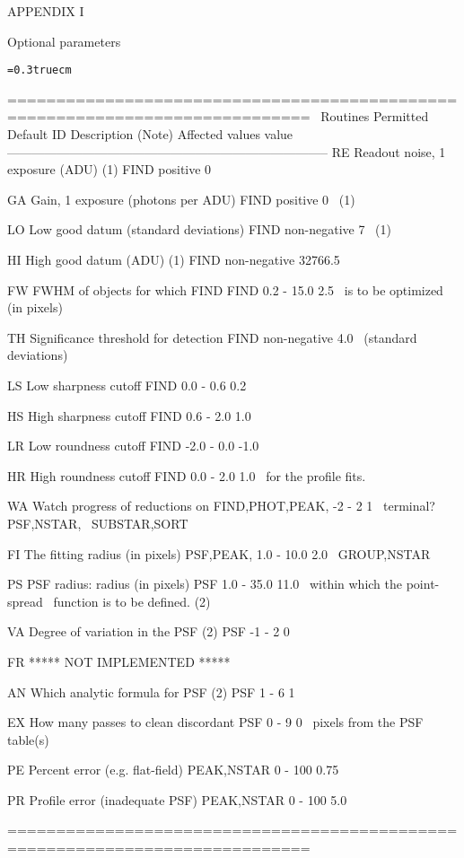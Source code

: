 \vfill
\eject
\centerline{APPENDIX I}
\bigskip
\centerline{Optional parameters}
\bigskip
{\noindent\obeylines\obeyspaces\frenchspacing\tt\baselineskip=0.3truecm

=============================================================================
\                                          Routines      Permitted     Default
ID        Description (Note)              Affected        values       value
-----------------------------------------------------------------------------
RE  Readout noise, 1 exposure (ADU) (1)     FIND         positive        0

GA  Gain, 1 exposure (photons per ADU)      FIND         positive        0
\    (1)

LO  Low good datum (standard deviations)    FIND       non-negative      7
\    (1)

HI  High good datum (ADU) (1)               FIND       non-negative   32766.5

FW  FWHM of objects for which FIND          FIND        0.2 - 15.0      2.5
\    is to be optimized (in pixels)

TH  Significance threshold for detection    FIND       non-negative     4.0
\    (standard deviations)

LS  Low sharpness cutoff                    FIND         0.0 - 0.6      0.2

HS  High sharpness cutoff                   FIND         0.6 - 2.0      1.0

LR  Low roundness cutoff                    FIND        -2.0 - 0.0     -1.0

HR  High roundness cutoff                   FIND         0.0 - 2.0      1.0
\    for the profile fits.

WA  Watch progress of reductions on    FIND,PHOT,PEAK,    -2 - 2         1
\    terminal?                            PSF,NSTAR,
\                                        SUBSTAR,SORT

FI  The fitting radius (in pixels)        PSF,PEAK,      1.0 - 10.0     2.0
\                                         GROUP,NSTAR

PS  PSF radius: radius (in pixels)          PSF          1.0 - 35.0    11.0
\    within which the point-spread
\    function is to be defined. (2)

VA  Degree of variation in the PSF (2)      PSF           -1 - 2         0

FR                         ***** NOT IMPLEMENTED *****

AN  Which analytic formula for PSF (2)      PSF            1 - 6         1

EX  How many passes to clean discordant     PSF            0 - 9         0
\    pixels from the PSF table(s)

PE  Percent error (e.g. flat-field)      PEAK,NSTAR       0 - 100       0.75

PR  Profile error (inadequate PSF)       PEAK,NSTAR       0 - 100       5.0

=============================================================================

}

